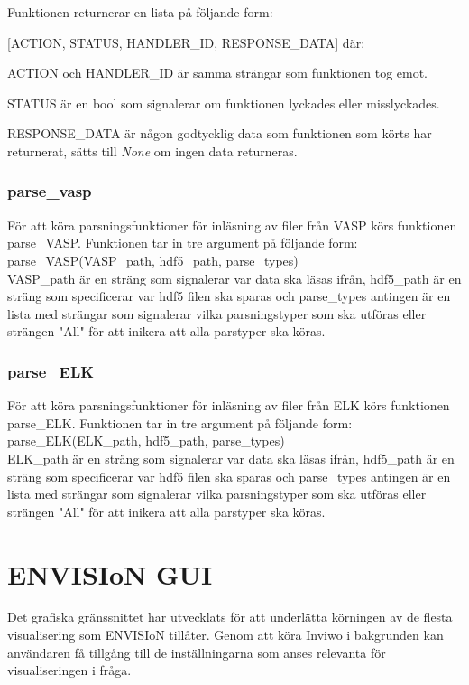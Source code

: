 \documentclass[10pt,oneside,swedish]{article}
\begin{document}
Funktionen returnerar en lista på följande form:

{[}ACTION, STATUS, HANDLER\_ID, RESPONSE\_DATA{]} där:

ACTION och HANDLER\_ID är samma strängar som funktionen tog emot.

STATUS är en bool som signalerar om funktionen lyckades eller
misslyckades.

RESPONSE\_DATA är någon godtycklig data som funktionen som körts har
returnerat, sätts till \emph{None} om ingen data returneras.

\subsubsection{parse\_vasp}\label{handle_parse_request}

För att köra parsningsfunktioner för inläsning av filer från VASP körs funktionen parse\_VASP. Funktionen tar in tre argument på följande form:\\

parse\_VASP(VASP\_path, hdf5\_path, parse\_types)\\ 

VASP\_path är en sträng som signalerar var data ska läsas ifrån, hdf5\_path är en sträng som specificerar var hdf5 filen ska sparas och parse\_types antingen är en  lista  med  strängar  som  signalerar  vilka parsningstyper som ska utföras eller strängen "All" för att inikera att alla parstyper ska köras.

\subsubsection{parse\_ELK}
För att köra parsningsfunktioner för inläsning av filer från ELK körs funktionen parse\_ELK. Funktionen tar in tre argument på följande form:\\

parse\_ELK(ELK\_path, hdf5\_path, parse\_types)\\ 

ELK\_path är en sträng som signalerar var data ska läsas ifrån, hdf5\_path är en sträng som specificerar var hdf5 filen ska sparas och parse\_types antingen är en  lista  med  strängar  som  signalerar  vilka parsningstyper som ska utföras eller strängen "All" för att inikera att alla parstyper ska köras.
\newpage
\section{ENVISIoN GUI}\label{gui}
Det grafiska gränssnittet har utvecklats för att underlätta körningen av de flesta visualisering som ENVISIoN tillåter. Genom att köra Inviwo i bakgrunden kan användaren få tillgång till de inställningarna som anses relevanta för visualiseringen i fråga. 
\end{document}
